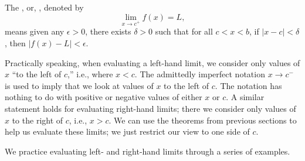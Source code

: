 {The , or, , denoted by  
$$\displaystyle \lim_{x\rightarrow c^+} f(x) = L,$$
means  given any $\epsilon > 0$, there exists $\delta > 0$ such that for all $c<x<b$,  
if  $|x - c| < \delta$, then $|f(x) - L| < \epsilon$.
}
\restoreboxwidth
\normalsize

Practically speaking, when evaluating a left-hand limit, we consider only values of $x$ ``to the left of $c$,'' i.e., where $x<c$. The admittedly imperfect notation $x\to c^-$ is used to imply that we look at values of $x$ to the left of $c$. The notation has nothing to do with positive or negative values of either $x$ or $c$. A similar statement holds for evaluating right-hand limits; there we consider only values of $x$ to the right of $c$, i.e., $x>c$. We can use the theorems from previous sections to help us evaluate these limits; we just restrict our view to one side of $c$.

We practice evaluating left- and right-hand limits through a series of examples.\\

